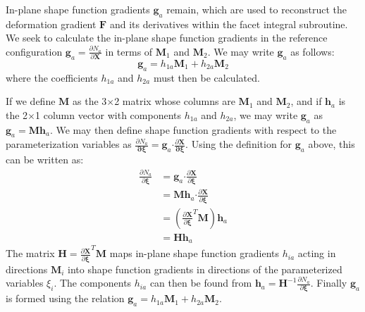 In-plane shape function gradients $\bm{g}_a$ remain, which are used to reconstruct the deformation gradient $\bm{F}$ and its derivatives within the facet integral subroutine. We seek to calculate the in-plane shape function gradients in the reference configuration $\bm{g}_a = \frac{\partial N_a}{\partial \bm{X}}$ in terms of $\bm{M}_1$ and $\bm{M}_2$. We may write $\bm{g}_a$ as follows:
\begin{equation}
{\bm {g}}_a = {h_{1a}}{\bm {M}}_1 + {h_{2a}}{\bm {M}}_2
\end{equation}
where the coefficients $h_{1a}$ and $h_{2a}$ must then be calculated.

If we define ${\bm {M}}$ as the 3$\times$2 matrix whose columns are ${\bm {M}}_1$ and ${\bm M}_2$, and if $\mathbf{h}_a$ is the 2$\times$1 column vector with components $h_{1a}$ and $h_{2a}$, we may write ${\bm g}_a$ as ${\bm g}_a = {\bm M}{\bm h}_a$. We may then define shape function gradients with respect to the parameterization variables as $\frac{\partial N_a}{\bm{\partial {\xi}}} = {\bm g}_a \bm{\cdot} \frac{\partial {\bm X}}{\bm{\partial {\xi}}}$. Using the definition for ${\bm g}_a$ above, this can be written as:
\begin{align}
\frac{\partial N_a}{\partial {\bm \xi}} &= {\bm g}_a \bm{\cdot} \frac{\partial {\bm X}}{\partial {\bm \xi}} \\
&= {\bm M}{\bm h}_a \bm{\cdot} \frac{\partial {\bm X}}{\partial {\bm \xi}} \\
&= (\frac{\partial {\bm X}}{\partial {\bm \xi}}^T{\bm M}){\bm h}_a \\
&= {\bm H}{\bm h}_a
\end{align}
The matrix ${\bm H} = \frac{\partial {\bm X}}{\partial {\bm \xi}}^T{\bm M}$ maps in-plane shape function gradients $h_{ia}$ acting in directions ${\bm M}_i$ into shape function gradients in directions of the parameterized variables ${\xi_i}$. The components $h_{ia}$ can then be found from ${\bm h}_a = {\bm H}^{-1}\frac{\partial N_a}{\partial {\bm \xi}}$. Finally ${\bm g}_a$ is formed using the relation ${\bm g}_a = {h_{1a}}{\bm M}_1 + {h_{2a}}{\bm M}_2$.

